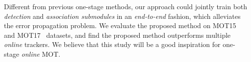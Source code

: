 \documentclass[acmsmall]{acmart}
\begin{document}

{
Different from previous one-stage methods, our approach could jointly train both \emph{detection} and \emph{association submodules} in an \emph{end-to-end} fashion,
which alleviates the error propagation problem. 
We evaluate the proposed method on MOT15~\cite{taix2015motchallenge} and MOT17~\cite{mot16} datasets, 
and find the proposed method outperforms multiple \emph{online} trackers.
}
We believe that this study will be a good inspiration for one-stage \emph{online} MOT. 
\end{document}
